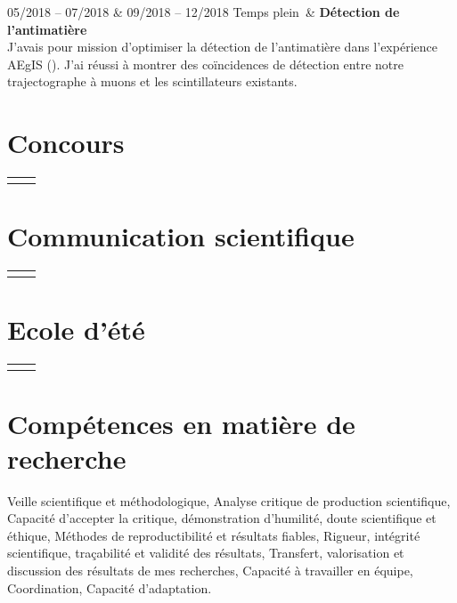 \documentclass[
	10pt,
]{FreemanCV}
\begin{document}
\begin{paracol}{2}
\jobentry
	{05/2018 -- 07/2018 \& 09/2018 -- 12/2018}
	{Temps plein}
	{\ipnl \,\& \cern}
	{}
	{\textbf{D\'etection de l'antimatière}}\\
	{
		J'avais pour mission d'optimiser la d\'etection de l'antimati\`ere dans l'exp\'erience AEgIS (\aegis). J'ai r\'eussi \`a montrer des co\"incidences de d\'etection entre notre trajectographe \`a muons et les scintillateurs existants.
	}


\section{Concours}

\begin{supertabular}{r l}
	\tableentry{}{\textit{\uca}}{}
	\tableentry{}{}{}
\end{supertabular}


\section{Communication scientifique}

\begin{supertabular}{r l}
\end{supertabular}


\section{Ecole d'\'et\'e}

\begin{supertabular}{r l}
\end{supertabular}


\section{Comp\'etences en matière de recherche}

Veille scientifique et m\'ethodologique,
Analyse critique de production scientifique,
Capacit\'e d'accepter la critique, d\'emonstration d'humilit\'e, doute scientifique et \'ethique,
M\'ethodes de reproductibilit\'e et r\'esultats fiables,
Rigueur, int\'egrit\'e scientifique, traçabilit\'e et validit\'e des r\'esultats,
Transfert, valorisation et discussion des r\'esultats de mes recherches,
Capacit\'e à travailler en \'equipe,
Coordination,
Capacit\'e d'adaptation.



\end{paracol}
\end{document}
